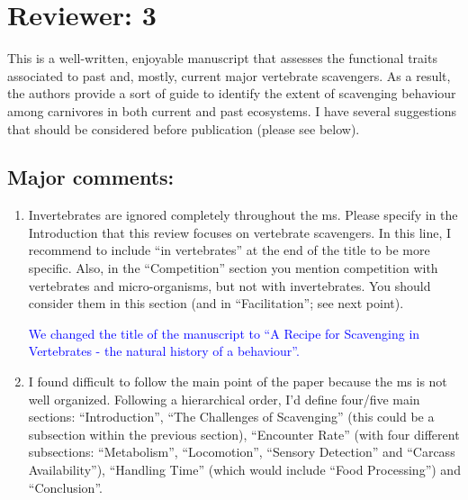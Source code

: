 \documentclass[12pt,letterpaper]{article}
\begin{document}
\section{Reviewer: 3}
This is a well-written, enjoyable manuscript that assesses the functional traits associated to past and, mostly, current major vertebrate scavengers.
As a result, the authors provide a sort of guide to identify the extent of scavenging behaviour among carnivores in both current and past ecosystems.
I have several suggestions that should be considered before publication (please see below).

\subsection{Major comments:}

\begin{enumerate}
\item{Invertebrates are ignored completely throughout the ms.
Please specify in the Introduction that this review focuses on vertebrate scavengers.
In this line, I recommend to include ``in vertebrates'' at the end of the title to be more specific.
Also, in the ``Competition'' section you mention competition with vertebrates and micro-organisms, but not with invertebrates.
You should consider them in this section (and in ``Facilitation''; see next point).}

\textcolor{blue}{We changed the title of the manuscript to ``A Recipe for Scavenging in Vertebrates - the natural history of a behaviour''.}

\item{I found difficult to follow the main point of the paper because the ms is not well organized. Following a hierarchical order, I'd define four/five main sections: ``Introduction'', ``The Challenges of Scavenging'' (this could be a subsection within the previous section), ``Encounter Rate'' (with four different subsections: ``Metabolism'', ``Locomotion'', ``Sensory Detection'' and ``Carcass Availability''), ``Handling Time'' (which would include ``Food Processing'') and ``Conclusion''. \\ 

}
\end{enumerate}
\end{document}

